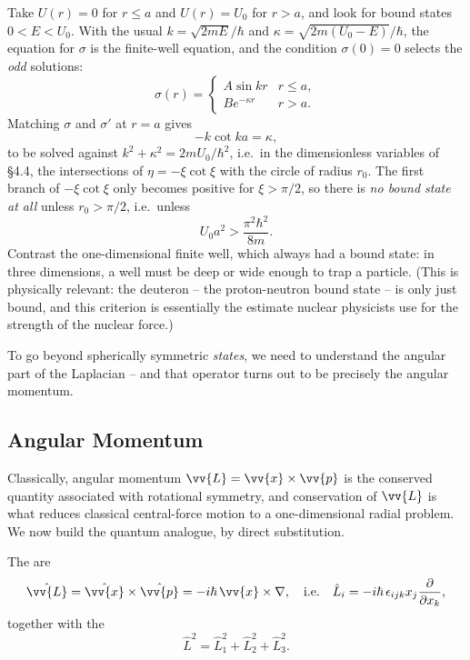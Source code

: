 \begin{example}
    Take $U(r) = 0$ for $r \leq a$ and $U(r) = U_0$ for $r > a$, and look for bound states $0 < E < U_0$. With the usual $k = \sqrt{2mE}/\hbar$ and $\kappa = \sqrt{2m(U_0 - E)}/\hbar$, the equation for $\sigma$ is the finite-well equation, and the condition $\sigma(0) = 0$ selects the \emph{odd} solutions:
    $$
    \sigma(r) = \begin{cases}
        A \sin kr & r \leq a, \\
        B e^{-\kappa r} & r > a.
    \end{cases}
    $$
    Matching $\sigma$ and $\sigma'$ at $r = a$ gives
    $$
    -k \cot ka = \kappa,
    $$
    to be solved against $k^2 + \kappa^2 = 2mU_0/\hbar^2$, i.e.\ in the dimensionless variables of \S 4.4, the intersections of $\eta = -\xi \cot \xi$ with the circle of radius $r_0$. The first branch of $-\xi\cot\xi$ only becomes positive for $\xi > \pi/2$, so there is \emph{no bound state at all} unless $r_0 > \pi/2$, i.e.\ unless
    $$
    U_0 a^2 > \frac{\pi^2 \hbar^2}{8m}.
    $$
    Contrast the one-dimensional finite well, which always had a bound state: in three dimensions, a well must be deep or wide enough to trap a particle. (This is physically relevant: the deuteron -- the proton-neutron bound state -- is only just bound, and this criterion is essentially the estimate nuclear physicists use for the strength of the nuclear force.)
\end{example}

To go beyond spherically symmetric \emph{states}, we need to understand the angular part of the Laplacian -- and that operator turns out to be precisely the angular momentum.

\subsection{Angular Momentum}

Classically, angular momentum $\vv{L} = \vv{x} \times \vv{p}$ is the conserved quantity associated with rotational symmetry, and conservation of $\vv{L}$ is what reduces classical central-force motion to a one-dimensional radial problem. We now build the quantum analogue, by direct substitution.

\begin{definition}
    The  are
    $$
    \hat{\vv{L}} = \hat{\vv{x}} \times \hat{\vv{p}} = -i \hbar \, \vv{x} \times \nabla, \quad \text{i.e.} \quad \hat{L}_i = -i\hbar \, \epsilon_{ijk} x_j \frac{\partial}{\partial x_k},
    $$
    together with the 
    $$
    \hat{L}^2 = \hat{L}_1^2 + \hat{L}_2^2 + \hat{L}_3^2.
    $$
\end{definition}

